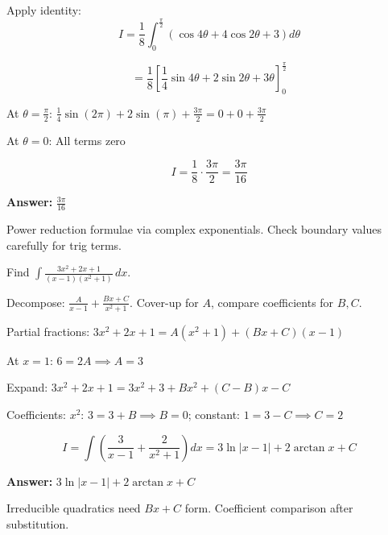 \begin{solution}
Apply identity:
\[
I = \frac{1}{8}\int_0^{\frac{\pi}{2}} (\cos 4\theta + 4\cos 2\theta + 3) d\theta
\]

\[
= \frac{1}{8}\left[\frac{1}{4}\sin 4\theta + 2\sin 2\theta + 3\theta\right]_0^{\frac{\pi}{2}}
\]

At $\theta=\frac{\pi}{2}$: $\frac{1}{4}\sin(2\pi) + 2\sin(\pi) + \frac{3\pi}{2} = 0 + 0 + \frac{3\pi}{2}$

At $\theta=0$: All terms zero

\[
I = \frac{1}{8} \cdot \frac{3\pi}{2} = \frac{3\pi}{16}
\]

\textbf{Answer:} $\boxed{\frac{3\pi}{16}}$
\end{solution}

\begin{takeaways}
Power reduction formulae via complex exponentials. Check boundary values carefully for trig terms.
\end{takeaways}

\vspace{1cm}

\begin{problem}
Find $\int \frac{3x^2 + 2x + 1}{(x-1)(x^2+1)} \, dx$.
\end{problem}

\begin{hint}
Decompose: $\frac{A}{x-1} + \frac{Bx+C}{x^2+1}$. Cover-up for $A$, compare coefficients for $B, C$.
\end{hint}

\begin{solution}
Partial fractions: $3x^2+2x+1 = A(x^2+1) + (Bx+C)(x-1)$

At $x=1$: $6 = 2A \implies A=3$

Expand: $3x^2+2x+1 = 3x^2+3 + Bx^2 + (C-B)x - C$

Coefficients: $x^2$: $3 = 3+B \implies B=0$; constant: $1 = 3-C \implies C=2$

\[
I = \int\left(\frac{3}{x-1} + \frac{2}{x^2+1}\right) dx = 3\ln|x-1| + 2\arctan x + C
\]

\textbf{Answer:} $\boxed{3\ln|x-1| + 2\arctan x + C}$
\end{solution}

\begin{takeaways}
Irreducible quadratics need $Bx+C$ form. Coefficient comparison after substitution.
\end{takeaways}

